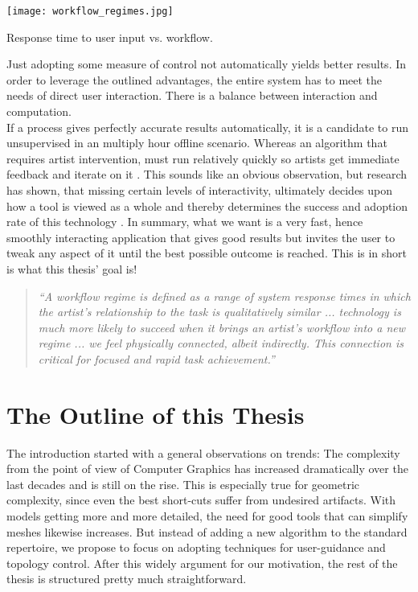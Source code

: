 \begin{floatingfigure}[r]{0.40\textwidth}
\centering
\texttt{[image: workflow\_regimes.jpg]}
\caption{Response time to user input vs. workflow.}
\label{fig:workflow_regimes}
\end{floatingfigure}
Just adopting some measure of control not automatically yields better results. 
In order to leverage the outlined advantages, the entire system has to meet the needs of direct user interaction.
There is a balance between interaction and computation.\\
If a process gives perfectly accurate results automatically, it is a candidate to run unsupervised in an multiply hour offline scenario.
Whereas an algorithm that requires artist intervention, must run relatively quickly so artists get immediate feedback and iterate on it \citep[cf.][p.20]{Hillman2010}.
This sounds like an obvious observation, but research has shown, that missing certain levels of interactivity, ultimately decides upon how a tool is viewed as a whole and thereby determines the success and adoption rate of this technology \citep[cf.][]{Enderton2011}.
In summary, what we want is a very fast, hence smoothly interacting application that gives good results but invites the user to tweak any aspect of it until the best possible outcome is reached.
This is in short is what this thesis' goal is!
\begin{quote} \textit{``A workflow regime is defined as a range of system response times in which the artist’s relationship to the task is qualitatively similar ... technology is much more likely to succeed when it brings an artist’s workflow into a new regime ... we feel physically connected, albeit indirectly. This connection is critical for focused and rapid task achievement.''} \citep[p.2]{Enderton2011} \end{quote}

\section{The Outline of this Thesis}
\label{introduction5}

The introduction started with a general observations on trends:
The complexity from the point of view of Computer Graphics has increased dramatically over the last decades and is still on the rise.
This is especially true for geometric complexity, since even the best short-cuts suffer from undesired artifacts. 
With models getting more and more detailed, the need for good tools that can simplify meshes likewise increases. 
But instead of adding a new algorithm to the standard repertoire, we propose to focus on adopting techniques for user-guidance and topology control.
After this widely argument for our motivation, the rest of the thesis is structured pretty much straightforward.

